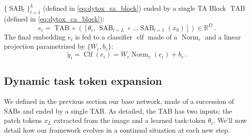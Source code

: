 $\{\operatorname{SAB}_l\}_{l=1}^{L}$ (defined in \autoref{eq:dytox_sa_block}) ended by a single TA Block
$\operatorname{TAB}$ (defined in \autoref{eq:dytox_ca_block}):
%
\begin{equation}
    e_i = \operatorname{TAB} \circ\, ([\theta_i,\, \operatorname{SAB}_{l=L} \circ\, ... \operatorname{SAB}_{l=1}(x_0)]) \in \mathbb{R}^D\,.
    \label{eq:dytox_cab_sab}
\end{equation}
%
The final embedding $e_i$ is fed to a classifier $\operatorname{clf}$ made of a
$\operatorname{Norm}_c$ and a linear projection parametrized by $\{W_c, b_c\}$:
%
\begin{equation}
    \tilde{y}_i = \operatorname{Clf}(e_i) = W_c \operatorname{Norm}_c(e_i) + b_c\,.
\end{equation}

\subsection{Dynamic task token expansion}
\label{sec:dytox_ensembling_tab}
We defined in the previous section our base network, made of a succession of SABs and ended by a
single TAB. As detailed, the TAB has two inputs: the patch tokens $x_L$ extracted from the image and
a learned task-token $\theta_i$. We'll now detail how our framework evolves in a continual situation
at each new step.

